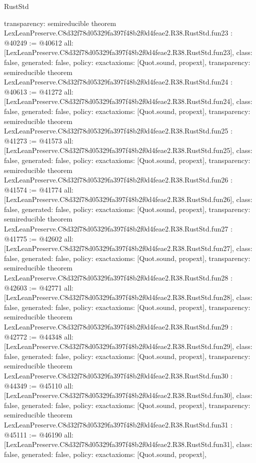 \begin{lexlean}{RustStd}
\begin{coremodule}
{  transparency: semireducible
}
theorem LexLeanPreserve.C8d32f78d05329fa397f48b2f0d4feae2.R38.RustStd.fun23 : @40249 := @40612 {
  all: [LexLeanPreserve.C8d32f78d05329fa397f48b2f0d4feae2.R38.RustStd.fun23],
  class: false,
  generated: false,
  policy: exact{axioms: [Quot.sound, propext]},
  transparency: semireducible
}
theorem LexLeanPreserve.C8d32f78d05329fa397f48b2f0d4feae2.R38.RustStd.fun24 : @40613 := @41272 {
  all: [LexLeanPreserve.C8d32f78d05329fa397f48b2f0d4feae2.R38.RustStd.fun24],
  class: false,
  generated: false,
  policy: exact{axioms: [Quot.sound, propext]},
  transparency: semireducible
}
theorem LexLeanPreserve.C8d32f78d05329fa397f48b2f0d4feae2.R38.RustStd.fun25 : @41273 := @41573 {
  all: [LexLeanPreserve.C8d32f78d05329fa397f48b2f0d4feae2.R38.RustStd.fun25],
  class: false,
  generated: false,
  policy: exact{axioms: [Quot.sound, propext]},
  transparency: semireducible
}
theorem LexLeanPreserve.C8d32f78d05329fa397f48b2f0d4feae2.R38.RustStd.fun26 : @41574 := @41774 {
  all: [LexLeanPreserve.C8d32f78d05329fa397f48b2f0d4feae2.R38.RustStd.fun26],
  class: false,
  generated: false,
  policy: exact{axioms: [Quot.sound, propext]},
  transparency: semireducible
}
theorem LexLeanPreserve.C8d32f78d05329fa397f48b2f0d4feae2.R38.RustStd.fun27 : @41775 := @42602 {
  all: [LexLeanPreserve.C8d32f78d05329fa397f48b2f0d4feae2.R38.RustStd.fun27],
  class: false,
  generated: false,
  policy: exact{axioms: [Quot.sound, propext]},
  transparency: semireducible
}
theorem LexLeanPreserve.C8d32f78d05329fa397f48b2f0d4feae2.R38.RustStd.fun28 : @42603 := @42771 {
  all: [LexLeanPreserve.C8d32f78d05329fa397f48b2f0d4feae2.R38.RustStd.fun28],
  class: false,
  generated: false,
  policy: exact{axioms: [Quot.sound, propext]},
  transparency: semireducible
}
theorem LexLeanPreserve.C8d32f78d05329fa397f48b2f0d4feae2.R38.RustStd.fun29 : @42772 := @44348 {
  all: [LexLeanPreserve.C8d32f78d05329fa397f48b2f0d4feae2.R38.RustStd.fun29],
  class: false,
  generated: false,
  policy: exact{axioms: [Quot.sound, propext]},
  transparency: semireducible
}
theorem LexLeanPreserve.C8d32f78d05329fa397f48b2f0d4feae2.R38.RustStd.fun30 : @44349 := @45110 {
  all: [LexLeanPreserve.C8d32f78d05329fa397f48b2f0d4feae2.R38.RustStd.fun30],
  class: false,
  generated: false,
  policy: exact{axioms: [Quot.sound, propext]},
  transparency: semireducible
}
theorem LexLeanPreserve.C8d32f78d05329fa397f48b2f0d4feae2.R38.RustStd.fun31 : @45111 := @46190 {
  all: [LexLeanPreserve.C8d32f78d05329fa397f48b2f0d4feae2.R38.RustStd.fun31],
  class: false,
  generated: false,
  policy: exact{axioms: [Quot.sound, propext]},
}
\end{coremodule}
\end{lexlean}
